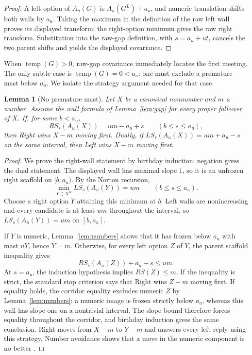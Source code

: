 \documentclass[11pt]{article}
\newtheorem{lemma}[theorem]{Lemma}
\theoremstyle{definition}
\theoremstyle{remark}
\newcommand{\temp}{\operatorname{temp}}
\begin{document}
\begin{proof}
A left option of $A_u(G)$ is $A_u(G^L)+a_u$, and numeric translation shifts
both walls by $a_u$.  Taking the maximum in the definition of the raw left
wall proves its displayed transform; the right-option minimum gives the raw
right transform.  Substitution into the raw-gap definition, with
$s=a_u+ut$, cancels the two parent shifts and yields the displayed covariance.
\end{proof}

When $\temp(G)>0$, raw-gap covariance immediately locates the
first meeting.  The only subtle case is $\temp(G)=0<a_u$: one must exclude a
premature mast below $a_u$.  We isolate the strategy argument needed for that
case.

\begin{lemma}[No premature mast]\label{lem:corridor}
Let $X$ be a canonical nonnumber and $m$ a number.  Assume the wall formula of
Lemma~\ref{lem:gap} for every proper follower of $X$.  If, for some
$b<a_u$,
\[
 RS_s(A_u(X))=um-a_u+s\qquad(b\le s\le a_u),
\]
then Right wins $X-m$ moving first.  Dually, if
$LS_s(A_u(X))=um+a_u-s$ on the same interval, then Left wins $X-m$ moving
first.
\end{lemma}

\begin{proof}
We prove the right-wall statement by birthday induction; negation gives the
dual statement.  The displayed wall has maximal slope $1$, so it is an
unfrozen right scaffold on $[b,a_u)$.  By the Norton recursion,
\[
  \min_{Y\in X^R}LS_s(A_u(Y))=um
  \qquad(b\le s\le a_u).
\]
Choose a right option $Y$ attaining this minimum at $b$.  Left walls are
nonincreasing and every candidate is at least $um$ throughout the interval,
so $LS_s(A_u(Y))=um$ on $[b,a_u]$.

If $Y$ is numeric, Lemma~\ref{lem:numbers} shows that it has frozen below
$a_u$ with mast $uY$, hence $Y=m$.  Otherwise, for every left option $Z$ of
$Y$, the parent scaffold inequality gives
\[
 RS_s(A_u(Z))+a_u-s\le um.
\]
At $s=a_u$, the induction hypothesis implies $RS(Z)\le m$.  If the inequality
is strict, the standard stop criterion says that Right wins $Z-m$ moving
first.  If equality holds, the corridor equality excludes numeric $Z$ by
Lemma~\ref{lem:numbers}: a numeric image is frozen strictly below $a_u$,
whereas this wall has slope one on a nontrivial interval.  The slope bound
therefore forces equality throughout the corridor, and birthday induction
gives the same conclusion.  Right moves
from $X-m$ to $Y-m$ and answers every left reply using this strategy.  Number
avoidance shows that a move in the numeric component is no better
\cite[Part II]{siegel2013}.
\end{proof}
\end{document}
